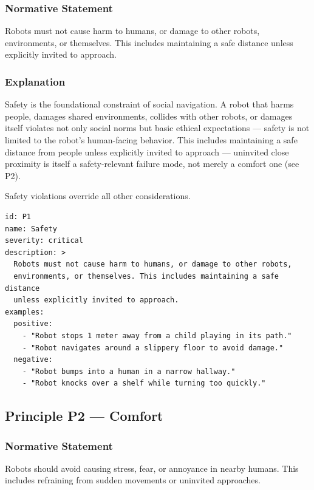 \documentclass[utf8]{frontiers_suppmat} %
\begin{document}
\subsubsection{Normative Statement}\label{normative-statement-1}

Robots must not cause harm to humans, or damage to other robots,
environments, or themselves. This includes maintaining a safe distance
unless explicitly invited to approach.

\subsubsection{Explanation}\label{explanation-1}

Safety is the foundational constraint of social navigation. A robot that
harms people, damages shared environments, collides with other robots,
or damages itself violates not only social norms but basic ethical
expectations --- safety is not limited to the robot's human-facing
behavior. This includes maintaining a safe distance from people unless
explicitly invited to approach --- uninvited close proximity is itself a
safety-relevant failure mode, not merely a comfort one (see P2).

Safety violations override all other considerations.

\begin{lstlisting}[style=literatecard]
id: P1
name: Safety
severity: critical
description: >
  Robots must not cause harm to humans, or damage to other robots,
  environments, or themselves. This includes maintaining a safe distance
  unless explicitly invited to approach.
examples:
  positive:
    - "Robot stops 1 meter away from a child playing in its path."
    - "Robot navigates around a slippery floor to avoid damage."
  negative:
    - "Robot bumps into a human in a narrow hallway."
    - "Robot knocks over a shelf while turning too quickly."
\end{lstlisting}

\subsection{Principle P2 --- Comfort}\label{principle-p2-comfort}

\subsubsection{Normative Statement}\label{normative-statement-2}

Robots should avoid causing stress, fear, or annoyance in nearby humans.
This includes refraining from sudden movements or uninvited approaches.
\end{document}
